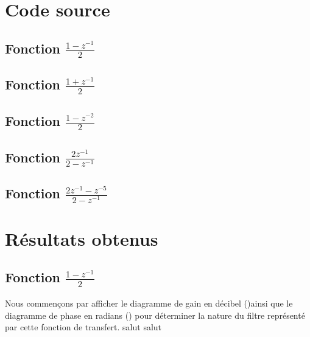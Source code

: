\section{Code source}
\subsection{Fonction $\frac{1-z^{-1}}{2}$}


\subsection{Fonction $\frac{1+z^{-1}}{2}$}


\subsection{Fonction $\frac{1-z^{-2}}{2}$}


\subsection{Fonction $\frac{2z^{-1}}{2-z^{-1}}$}


\subsection{Fonction $\frac{2z^{-1}-z^{-5}}{2-z^{-1}}$}


\section{Résultats obtenus}
\subsection{Fonction $\frac{1-z^{-1}}{2}$}
Nous commençons par afficher le diagramme de gain en décibel ()ainsi que le diagramme de phase en radians () pour déterminer la nature du filtre représenté par cette fonction de transfert.
salut
salut
